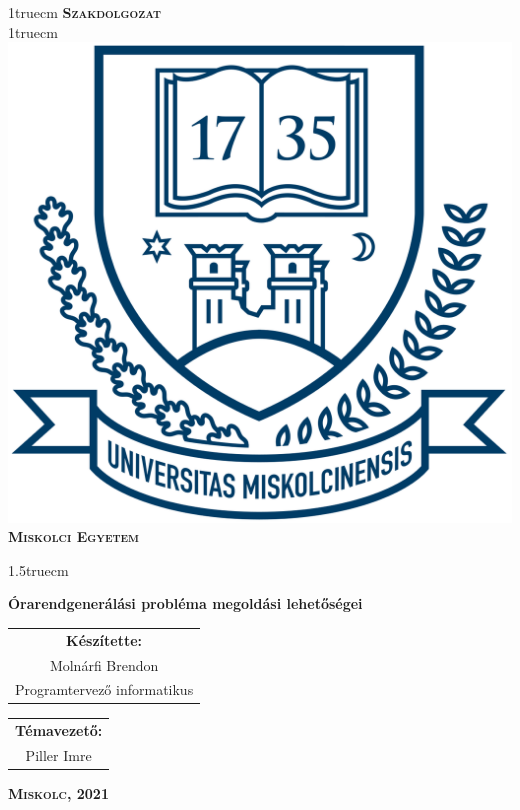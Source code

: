 \documentclass[12pt,a4paper]{report}
\begin{document}
\pagestyle{empty} %

{\large
\begin{center}
\vglue 1truecm
\textbf{\huge\textsc{Szakdolgozat}}\\
\vglue 1truecm
\includegraphics[width=4.8truecm, height=4truecm]{images/me_logo.png}\\
\textbf{\textsc{Miskolci Egyetem}}
\end{center}}

\vglue 1.5truecm %

{\LARGE
\begin{center}
\textbf{Órarendgenerálási probléma megoldási lehetőségei}
\end{center}}

\vspace*{2.5truecm}
{\large
\begin{center}
\begin{tabular}{c}
\textbf{Készítette:}\\
Molnárfi Brendon\\
Programtervező informatikus
\end{tabular}
\end{center}
\begin{center}
\begin{tabular}{c}
\textbf{Témavezető:}\\
Piller Imre
\end{tabular}
\end{center}}
\vfill
{\large
\begin{center}
\textbf{\textsc{Miskolc, 2021}}
\end{center}}
\end{document}
